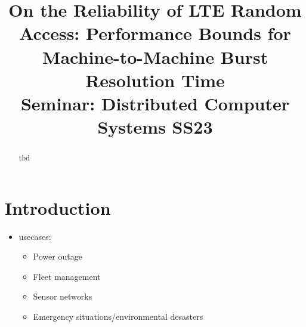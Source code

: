 \documentclass[conference]{IEEEtran}
\begin{document}
\title{On the Reliability of LTE Random Access: Performance Bounds for Machine-to-Machine Burst Resolution Time\\
{\footnotesize Seminar: Distributed Computer Systems SS23}}



\author{
}
\maketitle

\begin{abstract}
    tbd
\end{abstract}


\section{Introduction}
\begin{itemize}
    \item usecases:
    \begin{itemize}
        \item Power outage
        \item Fleet management
        \item Sensor networks
        \item Emergency situations/environmental desasters
    \end{itemize}
\end{itemize}
\end{document}
